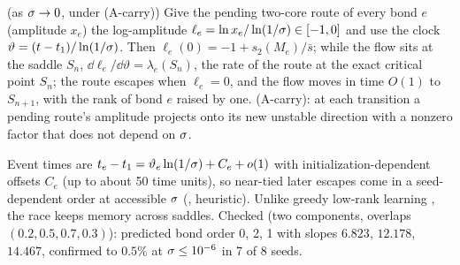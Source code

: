 \begin{proposition}\label{prop:A-agf-race}
  \derived{} (as $\sigma\to0$, under (A-carry)) 
  Give the pending two-core route of every bond $e$ (amplitude $x_e$) the log-amplitude
  $\ell_e=\ln x_e/\ln(1/\sigma)\in[-1,0]$ and use the clock $\vartheta=(t-t_{1})/\ln(1/\sigma)$. Then $\ell_e(0)=-1+s_2(M_e)/\bar s$;
  while the flow sits at the saddle $S_n$, $\dd\ell_e/\dd\vartheta=\lambda_e(S_n)$, the rate of the route at the exact
  critical point $S_n$; the route escapes when $\ell_e=0$, and the flow moves in time $O(1)$ to $S_{n+1}$, with the
  rank of bond $e$ raised by one. (A-carry): at each transition a pending route's amplitude projects onto its
  new unstable direction with a nonzero factor that does not depend on $\sigma$.
\end{proposition}
Event times are $t_{e}-t_{1}=\vartheta_e\ln(1/\sigma)+C_e+o(1)$ with initialization-dependent offsets $C_e$ (up to
about 50 time units), so near-tied later escapes come in a seed-dependent order at accessible $\sigma$
(\conjecture, heuristic). Unlike greedy low-rank learning \citep{li2021towards}, the race keeps memory
across saddles. Checked (two components, overlaps $(0.2,0.5,0.7,0.3)$): predicted bond order 0, 2, 1 with
slopes $6.823$, $12.178$, $14.467$, confirmed to $0.5\%$ at $\sigma\le10^{-6}$ in 7 of 8 seeds.

